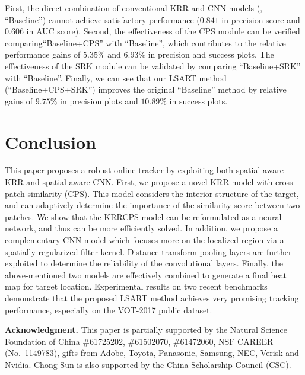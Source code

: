 \documentclass[10pt,twocolumn,letterpaper]{article}
\begin{document}
First,  the direct combination of conventional KRR and CNN models (\ie, ``Baseline'') cannot achieve
satisfactory performance ($0.841$ in precision score and $0.606$ in AUC score).
Second, the effectiveness of the CPS module can be verified comparing``Baseline+CPS'' with ``Baseline'',
which contributes to the relative performance gains of $5.35\%$ and $6.93\%$ in precision and success plots.
The effectiveness of the SRK module can be validated by comparing ``Baseline+SRK'' with ``Baseline''.
Finally, we can see that our LSART method (``Baseline+CPS+SRK'') improves the
original ``Baseline'' method by relative gains of $9.75\%$ in precision plots and $10.89\%$ in success plots.

\vspace{-2mm}
\section{Conclusion}
This paper proposes a robust online tracker by exploiting both spatial-aware KRR and spatial-aware
CNN.
First, we propose a novel KRR model with cross-patch similarity (CPS). This model considers the interior
structure of the target, and can adaptively determine the importance of the similarity score between two
patches. We show that the KRRCPS model can be reformulated as a neural network, and thus can be more
efficiently solved.
In addition, we propose a complementary CNN model which focuses more on the localized region via
a spatially regularized filter kernel. Distance transform pooling layers are further exploited to determine
the reliability of the convolutional layers.
Finally, the above-mentioned two models are effectively combined to generate a final heat map for target
location. Experimental results on two recent benchmarks demonstrate that the proposed LSART method
achieves very promising tracking performance, especially on the VOT-2017 public dataset.

\textbf{Acknowledgment.} This paper is partially supported by the Natural Science
Foundation of China \#61725202, \#61502070, \#61472060, NSF CAREER (No.~1149783), gifts from Adobe, Toyota, Panasonic, Samsung, NEC, Verisk and Nvidia.
Chong Sun is also supported by the China Scholarship Council (CSC).
\end{document}
